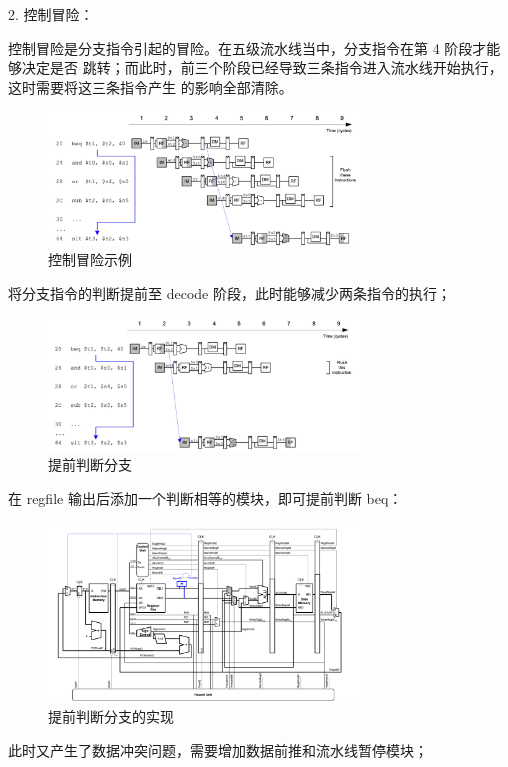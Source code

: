 2. 控制冒险：

控制冒险是分支指令引起的冒险。在五级流水线当中，分支指令在第 4 阶段才能够决定是否
跳转；而此时，前三个阶段已经导致三条指令进入流水线开始执行，这时需要将这三条指令产生
的影响全部清除。
\begin{figure}[H]
	\centering
	\includegraphics[width=0.75\textwidth]{figure/控制冒险示例.png}
	\caption{控制冒险示例}
	\label{fig:control_hazard}
\end{figure}
将分支指令的判断提前至 decode 阶段，此时能够减少两条指令的执行；
\begin{figure}[H]
	\centering
	\includegraphics[width=0.75\textwidth]{figure/提前判断分支.png}
	\caption{提前判断分支}
	\label{fig:control_hazard_forward}
\end{figure}
在 regfile 输出后添加一个判断相等的模块，即可提前判断 beq：
\begin{figure}[H]
	\centering
	\includegraphics[width=0.75\textwidth]{figure/提前判断分支的实现.png}
	\caption{提前判断分支的实现}
	\label{fig:control_hazard_forward_implementation}
\end{figure}
此时又产生了数据冲突问题，需要增加数据前推和流水线暂停模块；
